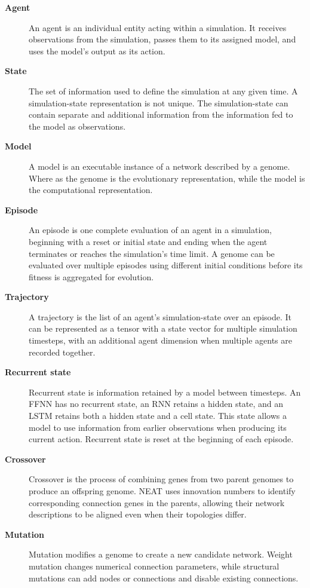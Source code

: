 \documentclass[11pt]{article}
\begin{document}
\begin{description}
    \item[\textbf{Agent}]
    An agent is an individual entity acting within a simulation. It
    receives observations from the simulation, passes them to its assigned
    model, and uses the model's output as its action.

    \item[\textbf{State}]
    The set of information used to define the simulation at any given time. A simulation-state representation is not unique. The simulation-state can contain separate and additional information from the information fed to the model as observations.

    \item[\textbf{Model}]
    A model is an executable instance of a network described by a genome. Where as the genome is the evolutionary
    representation, while the model is the computational representation.

    \item[\textbf{Episode}]
    An episode is one complete evaluation of an agent in a simulation,
    beginning with a reset or initial state and ending when the agent
    terminates or reaches the simulation's time limit. A genome can be evaluated over multiple
    episodes using different initial conditions before its fitness is aggregated for evolution.


    \item[\textbf{Trajectory}]
    A trajectory is the list of an agent's simulation-state over an
    episode. It can be represented as a tensor with a state vector for multiple simulation timesteps, with an additional agent dimension
    when multiple agents are recorded together.

    \item[\textbf{Recurrent state}]
    Recurrent state is information retained by a model between timesteps.
    An FFNN has no recurrent state, an RNN retains a hidden state, and an
    LSTM retains both a hidden state and a cell state. This state allows
    a model to use information from earlier observations when producing
    its current action. Recurrent state is reset at the beginning of
    each episode.

    \item[\textbf{Crossover}]
    Crossover is the process of combining genes from two parent genomes
    to produce an offspring genome. NEAT uses innovation numbers to
    identify corresponding connection genes in the parents, allowing
    their network descriptions to be aligned even when their topologies
    differ.

    \item[\textbf{Mutation}]
    Mutation modifies a genome to create a new candidate network. Weight
    mutation changes numerical connection parameters, while structural
    mutations can add nodes or connections and disable existing
    connections.

\end{description}
\end{document}
